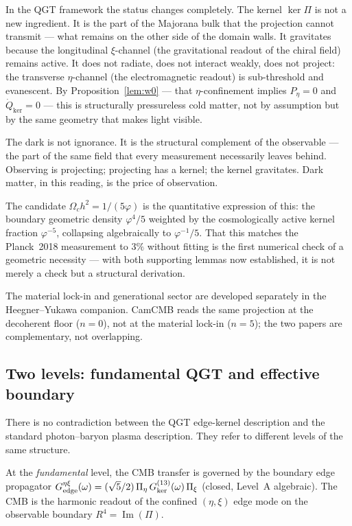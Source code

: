 \documentclass[twocolumn,10pt]{article}
\newcommand{\vp}{\varphi}
\newcommand{\kerPi}{\ker\Pi}
\begin{document}
In the QGT framework the status changes completely. The kernel
$\kerPi$ is not a new ingredient. It is the part of the Majorana
bulk that the projection cannot transmit — what remains on the other
side of the domain walls. It gravitates because the longitudinal
$\xi$-channel (the gravitational readout of the chiral field) remains
active. It does not radiate, does not interact weakly, does not
project: the transverse $\eta$-channel (the electromagnetic readout)
is sub-threshold and evanescent. By Proposition~\ref{lem:w0} —
that $\eta$-confinement implies $P_\eta=0$ and $\dot Q_{\ker}=0$
— this is structurally pressureless cold matter, not by assumption
but by the same geometry that makes light visible.

The dark is not ignorance. It is the structural complement of the
observable — the part of the same field that every measurement
necessarily leaves behind. Observing is projecting; projecting has a
kernel; the kernel gravitates. Dark matter, in this reading, is the
price of observation.

The candidate $\Omega_ch^2=1/(5\vp)$ is the quantitative expression
of this: the boundary geometric density $\vp^4/5$ weighted by the
cosmologically active kernel fraction $\vp^{-5}$, collapsing
algebraically to $\vp^{-1}/5$. That this matches the Planck~2018
measurement to $3\%$ without fitting is the first numerical check of
a geometric necessity — with both supporting lemmas now established,
it is not merely a check but a structural derivation.

The material lock-in and generational sector are developed separately
in the Heegner--Yukawa companion. CamCMB reads the same projection
at the decoherent floor ($n=0$), not at the material lock-in ($n=5$);
the two papers are complementary, not overlapping.

\subsection{Two levels: fundamental QGT and effective boundary}
\label{sec:two_levels}

There is no contradiction between the QGT edge-kernel description
and the standard photon--baryon plasma description.
They refer to different levels of the same structure.

At the \emph{fundamental} level, the CMB transfer is governed by the
boundary edge propagator
$G^{\eta\xi}_{\rm edge}(\omega)=(\sqrt{5}/2)\,\Pi_\eta\,
G_{\rm ker}^{(13)}(\omega)\,\Pi_\xi$
(closed, Level~A algebraic). The CMB is the harmonic readout of the
confined $(\eta,\xi)$ edge mode on the observable boundary
$R^4=\operatorname{Im}(\Pi)$.
\end{document}
